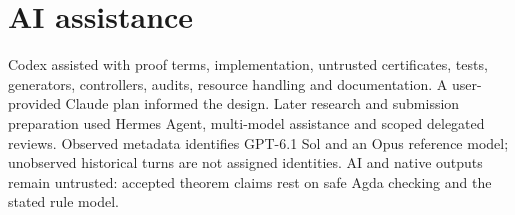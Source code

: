 \documentclass[10pt,a4paper]{article}
\begin{document}
\section{AI assistance}

Codex assisted with proof terms, implementation, untrusted certificates, tests, generators, controllers, audits, resource handling and documentation. A user-provided Claude plan informed the design. Later research and submission preparation used Hermes Agent, multi-model assistance and scoped delegated reviews. Observed metadata identifies GPT-6.1 Sol and an Opus reference model; unobserved historical turns are not assigned identities. AI and native outputs remain untrusted: accepted theorem claims rest on safe Agda checking and the stated rule model.
\end{document}
